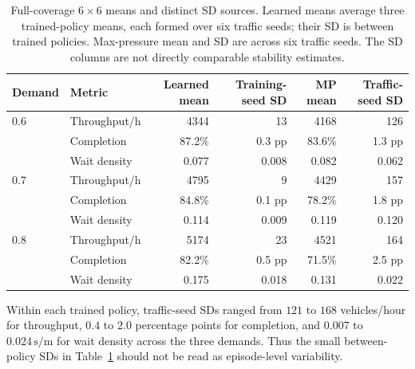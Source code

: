 \documentclass[10pt,a4paper]{article}
\begin{document}
\begin{table}[H]
  \footnotesize
  \centering
  \caption{Full-coverage \(6 \times 6\) means and distinct SD sources. Learned means average three trained-policy means, each formed over six traffic seeds; their SD is between trained policies. Max-pressure mean and SD are across six traffic seeds. The SD columns are not directly comparable stability estimates.}
  \begin{tabular}{@{}llrrrr@{}}
    \toprule
    Demand & Metric & Learned mean & Training-seed SD & MP mean & Traffic-seed SD\\
    \midrule
    0.6 & Throughput/h & 4344 & 13 & 4168 & 126\\
        & Completion & 87.2\% & 0.3 pp & 83.6\% & 1.3 pp\\
        & Wait density & 0.077 & 0.008 & 0.082 & 0.062\\
    0.7 & Throughput/h & 4795 & 9 & 4429 & 157\\
        & Completion & 84.8\% & 0.1 pp & 78.2\% & 1.8 pp\\
        & Wait density & 0.114 & 0.009 & 0.119 & 0.120\\
    0.8 & Throughput/h & 5174 & 23 & 4521 & 164\\
        & Completion & 82.2\% & 0.5 pp & 71.5\% & 2.5 pp\\
        & Wait density & 0.175 & 0.018 & 0.131 & 0.022\\
    \bottomrule
  \end{tabular}
  \label{tab:grid-detail}
\end{table}

Within each trained policy, traffic-seed SDs ranged from \(121\) to \(168\) vehicles/hour for throughput, \(0.4\) to \(2.0\) percentage points for completion, and \(0.007\) to \(0.024\,\mathrm{s/m}\) for wait density across the three demands.
Thus the small between-policy SDs in Table~\ref{tab:grid-detail} should not be read as episode-level variability.
\end{document}
